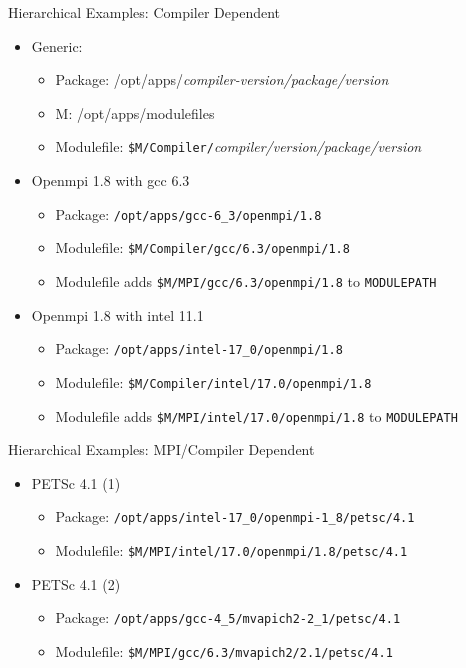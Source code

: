 \documentclass[dvipsnames,aspectratio=169]{beamer}
\begin{document}
\begin{frame}{Hierarchical Examples: Compiler Dependent}
  \begin{itemize}
    \item Generic:
      \begin{itemize}
        \item Package: /opt/apps/\emph{compiler-version/package/version}
        \item M: {\color{blue}/opt/apps/modulefiles}
        \item Modulefile: \texttt{{\color{blue}\$M}/Compiler/}\emph{compiler/version/package/version}
      \end{itemize}
    \item Openmpi 1.8 with gcc 6.3
      \begin{itemize}
        \item Package: \texttt{/opt/apps/gcc-6\_3/openmpi/1.8}
        \item Modulefile: \texttt{{\color{blue}\$M}/Compiler/gcc/6.3/openmpi/1.8}
        \item Modulefile adds \texttt{{\color{blue}\$M}/MPI/gcc/6.3/openmpi/1.8}
          to \texttt{MODULEPATH} \\
      \end{itemize}
    \item Openmpi 1.8 with intel 11.1
      \begin{itemize}
        \item Package: \texttt{/opt/apps/intel-17\_0/openmpi/1.8}
        \item Modulefile: \texttt{{\color{blue}\$M}/Compiler/intel/17.0/openmpi/1.8}
        \item Modulefile adds \texttt{\$M/MPI/intel/17.0/openmpi/1.8}
          to \texttt{MODULEPATH}

      \end{itemize}
  \end{itemize}
\end{frame}

\begin{frame}{Hierarchical Examples: MPI/Compiler Dependent}
  \begin{itemize}
    \item PETSc 4.1 (1)
      \begin{itemize}
        \item Package: \texttt{/opt/apps/intel-17\_0/openmpi-1\_8/petsc/4.1}
        \item Modulefile: \texttt{{\color{blue}\$M}/MPI/intel/17.0/openmpi/1.8/petsc/4.1}
      \end{itemize}
    \item PETSc 4.1 (2)
      \begin{itemize}
        \item Package: \texttt{/opt/apps/gcc-4\_5/mvapich2-2\_1/petsc/4.1}
        \item Modulefile: \texttt{{\color{blue}\$M}/MPI/gcc/6.3/mvapich2/2.1/petsc/4.1}
      \end{itemize}
  \end{itemize}
\end{frame}
\end{document}
